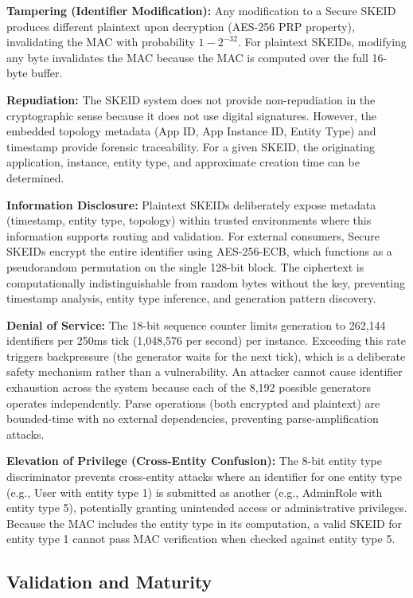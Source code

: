 \documentclass[fleqn,10pt,lineno]{wlpeerj}
\begin{document}
\textbf{Tampering (Identifier Modification):} Any modification to a
Secure SKEID produces different plaintext upon decryption (AES-256 PRP
property), invalidating the MAC with probability \(1 - 2^{-32}\). For
plaintext SKEIDs, modifying any byte invalidates the MAC because the MAC
is computed over the full 16-byte buffer.

\textbf{Repudiation:} The SKEID system does not provide non-repudiation
in the cryptographic sense because it does not use digital signatures.
However, the embedded topology metadata (App ID, App Instance ID, Entity
Type) and timestamp provide forensic traceability. For a given SKEID,
the originating application, instance, entity type, and approximate
creation time can be determined.

\textbf{Information Disclosure:} Plaintext SKEIDs deliberately expose
metadata (timestamp, entity type, topology) within trusted environments
where this information supports routing and validation. For external
consumers, Secure SKEIDs encrypt the entire identifier using
AES-256-ECB, which functions as a pseudorandom permutation on the single
128-bit block. The ciphertext is computationally indistinguishable from
random bytes without the key, preventing timestamp analysis, entity type
inference, and generation pattern discovery.

\textbf{Denial of Service:} The 18-bit sequence counter limits
generation to 262,144 identifiers per 250ms tick (1,048,576 per second)
per instance. Exceeding this rate triggers backpressure (the generator
waits for the next tick), which is a deliberate safety mechanism rather
than a vulnerability. An attacker cannot cause identifier exhaustion
across the system because each of the 8,192 possible generators operates
independently. Parse operations (both encrypted and plaintext) are
bounded-time with no external dependencies, preventing
parse-amplification attacks.

\textbf{Elevation of Privilege (Cross-Entity Confusion):} The 8-bit
entity type discriminator prevents cross-entity attacks where an
identifier for one entity type (e.g., User with entity type 1) is
submitted as another (e.g., AdminRole with entity type 5), potentially
granting unintended access or administrative privileges. Because the MAC
includes the entity type in its computation, a valid SKEID for entity
type 1 cannot pass MAC verification when checked against entity type 5.

\subsection{Validation and Maturity}\label{validation-and-maturity}
\end{document}
